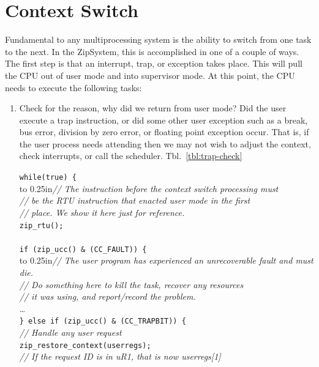 \documentclass{gqtekspec}
\begin{document}
\section{Context Switch}

Fundamental to any multiprocessing system is the ability to switch from one
task to the next.  In the ZipSystem, this is accomplished in one of a couple of
ways.  The first step is that an interrupt, trap, or exception takes place.
This will pull the CPU out of user mode and into supervisor mode.  At this
point, the CPU needs to execute the following tasks:
\begin{enumerate}
\item Check for the reason, why did we return from user mode?  Did the user
	execute a trap instruction, or did some other user exception such as a
	break, bus error, division by zero error, or floating point exception
	occur.  That is, if the user process needs attending then we may not
	wish to adjust the context, check interrupts, or call the scheduler. 
	Tbl.~\ref{tbl:trap-check}
\begin{table}\begin{center}
\begin{tabbing}
{\tt while(true) \{} \\
	\hbox to 0.25in{}\={\em // The instruction before the context switch processing must} \\
\>	{\em // be the RTU instruction that enacted user mode in the first} \\
\>	{\em // place.  We show it here just for reference.} \\
\>	{\tt zip\_rtu();} \\
\\
\>	{\tt if (zip\_ucc() \& (CC\_FAULT)) \{} \\
\>	\hbox to 0.25in{}\={\em // The user program has experienced an unrecoverable fault and must die.}\\
\>\>	{\em // Do something here to kill the task, recover any resources} \\
\>\>		{\em // it was using, and report/record the problem.}\\
\>\>		\ldots \\
\>	{\tt \} else if (zip\_ucc() \& (CC\_TRAPBIT)) \{} \\
\>\>		{\em // Handle any user request} \\
\>\>		{\tt zip\_restore\_context(userregs);} \\
\>\>		{\em // If the request ID is in uR1, that is now userregs[1]}\\

\end{tabbing}
\end{center}
\end{table}
\end{enumerate}
\end{document}
